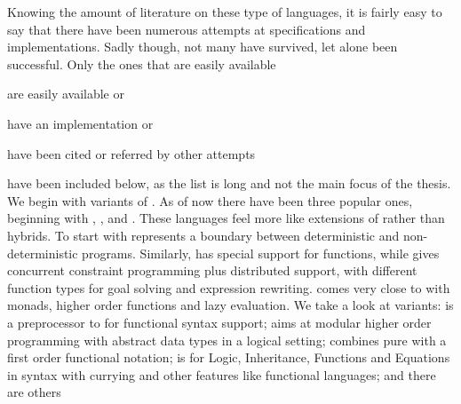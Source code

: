\documentclass[thesis-solanki.tex]{subfiles}
\begin{document}
Knowing the amount of literature  on these type of languages, it is fairly easy to say that there have been numerous 
attempts at specifications and implementations.
Sadly though, not many have survived, let alone been successful.
Only the ones that are easily available
\begin{inparaenum}[(a)]
\item
  are easily available or
\item
  have an implementation or
\item
  have been cited or referred by other attempts
\end{inparaenum}
have been included below, as the list is long and not the main focus of the thesis.
We begin with
variants of
.
As of now there have been three popular ones, beginning with , \cite{website:nue-prolog},
 \cite{website:oz-mozart} and  \cite{website:mercury}.
These languages feel more like extensions of  rather than hybrids.
To start with  represents a boundary between deterministic and non-deterministic programs.
Similarly,  has special support for functions, while  gives concurrent constraint
programming plus distributed support, with different function types for goal solving and expression rewriting.
 \cite{lloyd1999programming:escher} comes very close to  with monads, higher
order functions and lazy evaluation.
 We take a look at  variants:   is a preprocessor
    to  for functional syntax support; 
    aims at modular higher order programming with abstract data types in a logical setting;
      combines pure
     with a first order functional 
    notation;   is for  Logic, Inheritance, Functions and Equations in
     syntax with currying and other features like functional languages; and there are others
\end{document}
